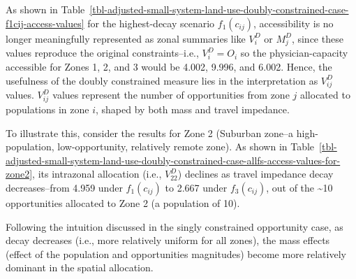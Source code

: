 \documentclass[
  10pt,
  letterpaper,
]{article}
\begin{document}
As shown in
Table~\ref{tbl-adjusted-small-system-land-use-doubly-constrained-case-f1cij-access-values}
for the highest-decay scenario \(f_1(c_{ij})\), accessibility is no
longer meaningfully represented as zonal summaries like \(V^D_i\) or
\(M^D_j\), since these values reproduce the original constraints--i.e.,
\(V^D_i = O_i\) so the physician-capacity accessible for Zones 1, 2, and
3 would be 4.002, 9.996, and 6.002. Hence, the usefulness of the doubly
constrained measure lies in the interpretation as \(V_{ij}^D\) values.
\(V^D_{ij}\) values represent the number of opportunities from zone
\(j\) allocated to populations in zone \(i\), shaped by both mass and
travel impedance.

To illustrate this, consider the results for Zone 2 (Suburban zone--a
high-population, low-opportunity, relatively remote zone). As shown in
Table~\ref{tbl-adjusted-small-system-land-use-doubly-constrained-case-allfs-access-values-for-zone2},
its intrazonal allocation (i.e., \(V^D_{22}\)) declines as travel
impedance decay decreases--from 4.959 under \(f_1(c_{ij})\) to 2.667
under \(f_3(c_{ij})\), out of the \textasciitilde10 opportunities
allocated to Zone 2 (a population of 10).

Following the intuition discussed in the singly constrained opportunity
case, as decay decreases (i.e., more relatively uniform for all zones),
the mass effects (effect of the population and opportunities magnitudes)
become more relatively dominant in the spatial allocation.
\end{document}
